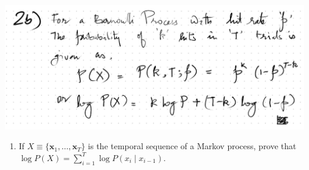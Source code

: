 \documentclass[12pt]{tiet-question-paper}
\begin{document}
\begin{center}
\includegraphics[width=.9\linewidth]{org-download-images/2024-11-12_10-18-39_screenshot.png}
\end{center}


\bvrskipline[0.25]
\begin{enumerate}[resume]
\item If \(X\equiv\{\mathbf{x}_1,\ldots,\mathbf{x}_T\}\) is
the temporal sequence of a Markov process, prove
that \(\log P(X) = \sum_{i=1}^T \log P(x_i\mid x_{i-1})\).
\end{enumerate}


\newpage
{}

\newpage
\bvrhrule
\end{document}
